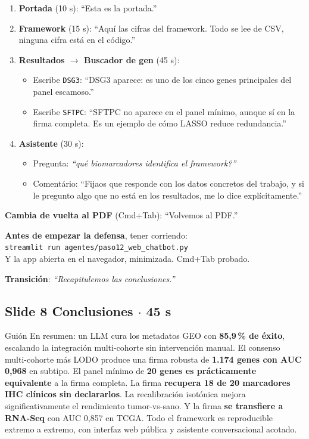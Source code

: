 \documentclass[11pt, a4paper]{article}
\newcommand{\slidebadge}[1]{{\colorbox{verdeTerm}{\color{white}\bfseries\;#1\;}}}
\begin{document}
\begin{enumerate}[leftmargin=1.4em, itemsep=3pt]
  \item \textbf{Portada} (10 s): ``Esta es la portada.''
  \item \textbf{Framework} (15 s): ``Aqu\'i las cifras del framework. Todo se lee de CSV, ninguna cifra est\'a en el c\'odigo.''
  \item \textbf{Resultados $\to$ Buscador de gen} (45 s):
    \begin{itemize}
      \item Escribe \texttt{DSG3}: ``DSG3 aparece: es uno de los cinco genes principales del panel escamoso.''
      \item Escribe \texttt{SFTPC}: ``SFTPC no aparece en el panel m\'inimo, aunque s\'i en la firma completa. Es un ejemplo de c\'omo LASSO reduce redundancia.''
    \end{itemize}
  \item \textbf{Asistente} (30 s):
    \begin{itemize}
      \item Pregunta: \emph{``qu\'e biomarcadores identifica el framework?''}
      \item Coment\'ario: ``Fijaos que responde con los datos concretos del trabajo, y si le pregunto algo que no est\'a en los resultados, me lo dice expl\'icitamente.''
    \end{itemize}
\end{enumerate}

\textbf{Cambia de vuelta al PDF} (Cmd+Tab): ``Volvemos al PDF.''

\begin{tipbox}
\textbf{Antes de empezar la defensa}, tener corriendo:\\[3pt]
\texttt{streamlit run agentes/paso12\_web\_chatbot.py}\\[3pt]
Y la app abierta en el navegador, minimizada. Cmd+Tab probado.
\end{tipbox}

\textbf{Transici\'on}: \emph{``Recapitulemos las conclusiones.''}

\subsection*{\slidebadge{Slide 8} Conclusiones $\cdot$ 45 s}

\begin{guioncaja}{Gui\'on}
En resumen: un LLM cura los metadatos GEO con \textbf{85,9\,\% de \'exito}, escalando la integraci\'on multi-cohorte sin intervenci\'on manual. El consenso multi-cohorte m\'as LODO produce una firma robusta de \textbf{1.174 genes con AUC 0,968} en subtipo. El panel m\'inimo de \textbf{20 genes es pr\'acticamente equivalente} a la firma completa. La firma \textbf{recupera 18 de 20 marcadores IHC cl\'inicos sin declararlos}. La recalibraci\'on isot\'onica mejora significativamente el rendimiento tumor-vs-sano. Y la firma \textbf{se transfiere a RNA-Seq} con AUC 0,857 en TCGA. Todo el framework es reproducible extremo a extremo, con interfaz web p\'ublica y asistente conversacional acotado.
\end{guioncaja}
\end{document}
